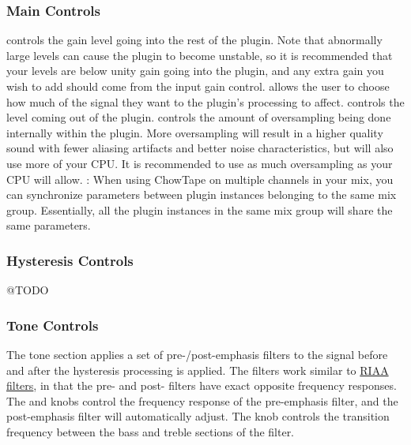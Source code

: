 \documentclass[landscape,twocolumn,a5paper]{manual}
\begin{document}
\subsubsection{Main Controls}
 controls the gain level going into the
rest of the plugin. Note that abnormally large levels can
cause the plugin to become unstable, so it is recommended
that your levels are below unity gain going into the plugin,
and any extra gain you wish to add should come from the input
gain control. %
\newpar
{} allows the user to choose how much of the
signal they want to the plugin's processing to affect.
\newpar
{} controls the level coming out of the plugin.
\newpar
{} controls the amount of oversampling
being done internally within the plugin. More oversampling
will result in a higher quality sound with fewer aliasing
artifacts and better noise characteristics, but will also
use more of your CPU. It is recommended to use as much
oversampling as your CPU will allow.
\newpar
{}: When using ChowTape on multiple channels
in your mix, you can synchronize parameters between plugin
instances belonging to the same mix group. Essentially, all
the plugin instances in the same mix group will share the same
parameters.

\subsubsection{Hysteresis Controls}
@TODO

\subsubsection{Tone Controls}
The tone section applies a set of pre-/post-emphasis filters
to the signal before and after the hysteresis processing
is applied. The filters work similar to
\href{https://en.wikipedia.org/wiki/RIAA_equalization}{RIAA filters},
in that the pre- and post- filters have exact opposite frequency
responses.
\newpar
The  and  knobs control
the frequency response of the pre-emphasis filter, and the
post-emphasis filter will automatically adjust. The
 knob controls the transition frequency
between the bass and treble sections of the filter.
\end{document}
